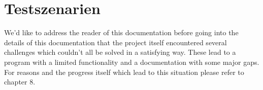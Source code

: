 \section{Testszenarien}
\label{sec:Testszenarien}

We'd like to address the reader of this documentation before going into the details of this documentation that the project itself encountered several challenges which couldn't all be solved in a satisfying way. These lead to a program with a limited functionality and a documentation with some major gaps. For reasons and the progress itself which lead to this situation please refer to chapter 8.